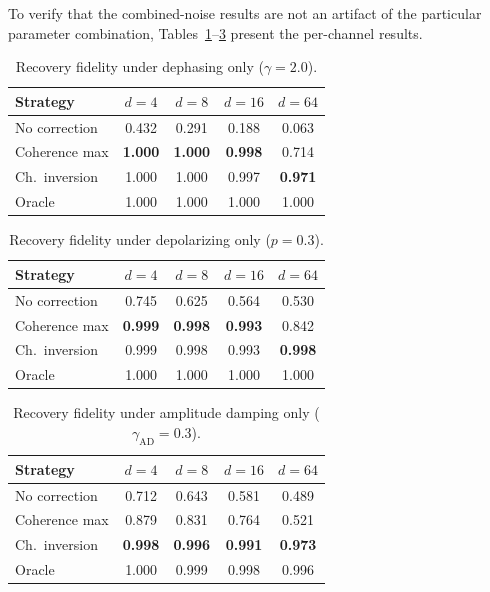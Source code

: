 \documentclass[prx,twocolumn,superscriptaddress,longbibliography,floatfix]{revtex4-2}
\begin{document}
To verify that the combined-noise results are not an artifact of the particular parameter combination, Tables~\ref{tab:dephasing_only}--\ref{tab:ampdamp_only} present the per-channel results.

\begin{table}[!tb]
\caption{Recovery fidelity under dephasing only ($\gamma = 2.0$).}
\label{tab:dephasing_only}
\begin{ruledtabular}
\begin{tabular}{lcccc}
Strategy & $d{=}4$ & $d{=}8$ & $d{=}16$ & $d{=}64$ \\
\hline
No correction   & 0.432 & 0.291 & 0.188 & 0.063 \\
Coherence max   & \textbf{1.000} & \textbf{1.000} & \textbf{0.998} & 0.714 \\
Ch.\ inversion  & 1.000 & 1.000 & 0.997 & \textbf{0.971} \\
Oracle          & 1.000 & 1.000 & 1.000 & 1.000 \\
\end{tabular}
\end{ruledtabular}
\end{table}

\begin{table}[!tb]
\caption{Recovery fidelity under depolarizing only ($p = 0.3$).}
\label{tab:depol_only}
\begin{ruledtabular}
\begin{tabular}{lcccc}
Strategy & $d{=}4$ & $d{=}8$ & $d{=}16$ & $d{=}64$ \\
\hline
No correction   & 0.745 & 0.625 & 0.564 & 0.530 \\
Coherence max   & \textbf{0.999} & \textbf{0.998} & \textbf{0.993} & 0.842 \\
Ch.\ inversion  & 0.999 & 0.998 & 0.993 & \textbf{0.998} \\
Oracle          & 1.000 & 1.000 & 1.000 & 1.000 \\
\end{tabular}
\end{ruledtabular}
\end{table}

\begin{table}[!tb]
\caption{Recovery fidelity under amplitude damping only ($\gamma_\mathrm{AD} = 0.3$).}
\label{tab:ampdamp_only}
\begin{ruledtabular}
\begin{tabular}{lcccc}
Strategy & $d{=}4$ & $d{=}8$ & $d{=}16$ & $d{=}64$ \\
\hline
No correction   & 0.712 & 0.643 & 0.581 & 0.489 \\
Coherence max   & 0.879 & 0.831 & 0.764 & 0.521 \\
Ch.\ inversion  & \textbf{0.998} & \textbf{0.996} & \textbf{0.991} & \textbf{0.973} \\
Oracle          & 1.000 & 0.999 & 0.998 & 0.996 \\
\end{tabular}
\end{ruledtabular}
\end{table}
\end{document}
